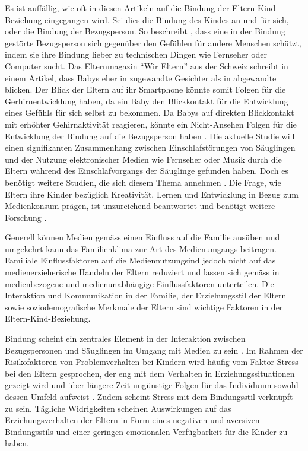 Es ist auffällig, wie oft in diesen Artikeln auf die Bindung der Eltern-Kind-Beziehung eingegangen wird. Sei dies die Bindung des Kindes an und für sich, oder die Bindung der Bezugsperson. So beschreibt , dass eine in der Bindung gestörte Bezugsperson sich gegenüber den Gefühlen für andere Menschen schützt, indem sie ihre Bindung lieber zu technischen Dingen wie Fernseher oder Computer sucht. Das Elternmagazin \enquote{Wir Eltern} aus der Schweiz schreibt in einem Artikel, dass Babys eher in zugewandte Gesichter als in abgewandte blicken. Der Blick der Eltern auf ihr Smartphone könnte somit Folgen für die Gerhirnentwicklung haben, da ein Baby den Blickkontakt für die Entwicklung eines Gefühls für sich selbst zu bekommen. Da Babys auf direkten Blickkontakt mit erhöhter Gehirnaktivität reagieren, könnte ein Nicht-Ansehen Folgen für die Entwicklung der Bindung auf die Bezugsperson haben \cite{Weber2017}. Die aktuelle Studie  will einen signifikanten Zusammenhang zwischen Einschlafstörungen von Säuglingen und der Nutzung elektronischer Medien wie Fernseher oder Musik durch die Eltern während des Einschlafvorgangs der Säuglinge gefunden haben. Doch es benötigt weitere Studien, die sich diesem Thema annehmen \cite{Wartella2016}. Die Frage, wie Eltern ihre Kinder bezüglich Kreativität, Lernen und Entwicklung in Bezug zum Medienkonsum prägen, ist unzureichend beantwortet und benötigt weitere Forschung \cite{AmericanAcademyofPediatrics2011,Troseth2016}. 

Generell können Medien gemäss  einen Einfluss auf die Familie ausüben und umgekehrt kann das Familienklima zur Art des Medienumgangs beitragen. Familiale Einflussfaktoren auf die Mediennutzungsind  jedoch  nicht  auf  das  medienerzieherische  Handeln  der  Eltern  reduziert  und  lassen sich gemäss \cite{Kammerl2012} in medienbezogene und medienunabhängige Einflussfaktoren unterteilen. Die Interaktion und Kommunikation in der Familie, der Erziehungsstil der Eltern sowie soziodemografische Merkmale der Eltern sind wichtige Faktoren in der Eltern-Kind-Beziehung.

Bindung scheint ein zentrales Element in der Interaktion zwischen Bezugspersonen und Säuglingen im Umgang mit Medien zu sein \cite{Prekop2017, Huether2017, Blikk2017}. Im Rahmen der Risikofaktoren von Problemverhalten bei Kindern wird häufig vom Faktor Stress bei den Eltern gesprochen, der eng mit dem Verhalten in Erziehungssituationen gezeigt wird und über längere Zeit ungünstige Folgen für das Individuum sowohl dessen Umfeld aufweist \cite{Cina2009}. Zudem scheint Stress mit dem Bindungsstil verknüpft zu sein. Tägliche Widrigkeiten scheinen Auswirkungen auf das Erziehungsverhalten der Eltern in Form eines negativen und aversiven Bindungsstils \cite{Dumas1989, Webster-Stratton1988} und einer geringen emotionalen Verfügbarkeit für die Kinder \cite{Campbell1991} zu haben. 

